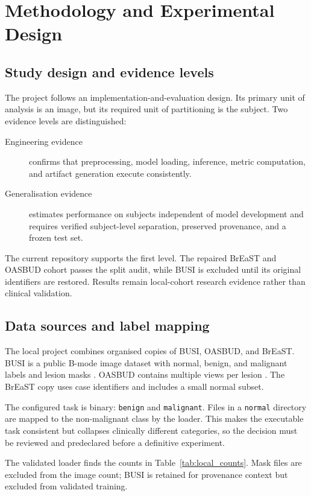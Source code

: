 \chapter{Methodology and Experimental Design}
\label{ch:methodology}

\section{Study design and evidence levels}
The project follows an implementation-and-evaluation design. Its primary unit of analysis is an image, but its required unit of partitioning is the subject. Two evidence levels are distinguished:

\begin{description}
    \item[Engineering evidence] confirms that preprocessing, model loading, inference, metric computation, and artifact generation execute consistently.
    \item[Generalisation evidence] estimates performance on subjects independent of model development and requires verified subject-level separation, preserved provenance, and a frozen test set.
\end{description}

The current repository supports the first level. The repaired BrEaST and OASBUD cohort passes the split audit, while BUSI is excluded until its original identifiers are restored. Results remain local-cohort research evidence rather than clinical validation.

\section{Data sources and label mapping}
The local project combines organised copies of BUSI, OASBUD, and BrEaST. BUSI is a public B-mode image dataset with normal, benign, and malignant labels and lesion masks \citep{AlDhabyani2020}. OASBUD contains multiple views per lesion \citep{Piotrzkowska2017}. The BrEaST copy uses case identifiers and includes a small normal subset.

The configured task is binary: \texttt{benign} and \texttt{malignant}. Files in a \texttt{normal} directory are mapped to the non-malignant class by the loader. This makes the executable task consistent but collapses clinically different categories, so the decision must be reviewed and predeclared before a definitive experiment.

The validated loader finds the counts in Table~\ref{tab:local_counts}. Mask files are excluded from the image count; BUSI is retained for provenance context but excluded from validated training.

